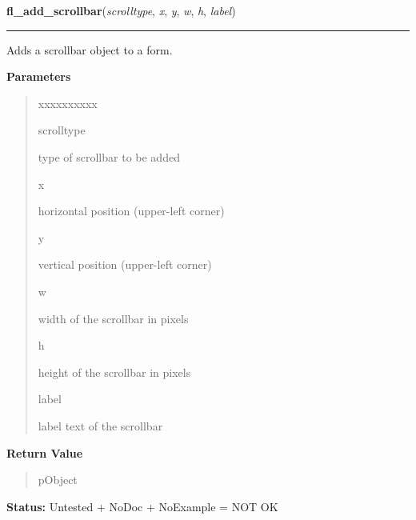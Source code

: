     \label{xformslib:library:fl_add_scrollbar}

    \vspace{0.5ex}

\hspace{.8\funcindent}\begin{boxedminipage}{\funcwidth}

    \raggedright \textbf{fl\_add\_scrollbar}(\textit{scrolltype}, \textit{x}, \textit{y}, \textit{w}, \textit{h}, \textit{label})

    \vspace{-1.5ex}

    \rule{\textwidth}{0.5\fboxrule}
\setlength{\parskip}{2ex}
    Adds a scrollbar object to a form.

\setlength{\parskip}{1ex}
      \textbf{Parameters}
      \vspace{-1ex}

      \begin{quote}
        \begin{Ventry}{xxxxxxxxxx}

          \item[scrolltype]

          type of scrollbar to be added

          \item[x]

          horizontal position (upper-left corner)

          \item[y]

          vertical position (upper-left corner)

          \item[w]

          width of the scrollbar in pixels

          \item[h]

          height of the scrollbar in pixels

          \item[label]

          label text of the scrollbar

        \end{Ventry}

      \end{quote}

      \textbf{Return Value}
    \vspace{-1ex}

      \begin{quote}
      pObject

      \end{quote}

\textbf{Status:} Untested + NoDoc + NoExample = NOT OK



    \end{boxedminipage}

